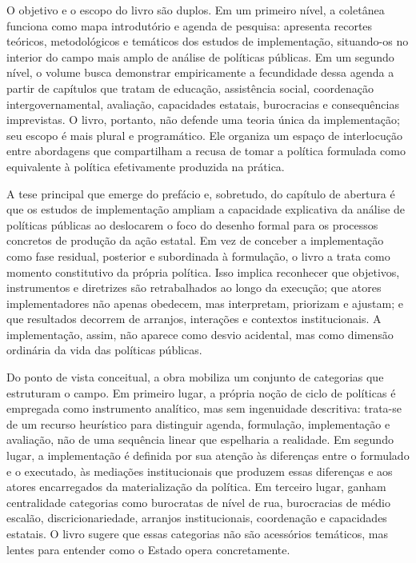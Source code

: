 \documentclass[12pt,a4paper]{article}
\begin{document}
O objetivo e o escopo do livro são duplos. Em um primeiro nível, a coletânea funciona como mapa introdutório e agenda de pesquisa: apresenta recortes teóricos, metodológicos e temáticos dos estudos de implementação, situando-os no interior do campo mais amplo de análise de políticas públicas. Em um segundo nível, o volume busca demonstrar empiricamente a fecundidade dessa agenda a partir de capítulos que tratam de educação, assistência social, coordenação intergovernamental, avaliação, capacidades estatais, burocracias e consequências imprevistas. O livro, portanto, não defende uma teoria única da implementação; seu escopo é mais plural e programático. Ele organiza um espaço de interlocução entre abordagens que compartilham a recusa de tomar a política formulada como equivalente à política efetivamente produzida na prática. \parencite{lotta2019_teorias_analises}

A tese principal que emerge do prefácio e, sobretudo, do capítulo de abertura é que os estudos de implementação ampliam a capacidade explicativa da análise de políticas públicas ao deslocarem o foco do desenho formal para os processos concretos de produção da ação estatal. Em vez de conceber a implementação como fase residual, posterior e subordinada à formulação, o livro a trata como momento constitutivo da própria política. Isso implica reconhecer que objetivos, instrumentos e diretrizes são retrabalhados ao longo da execução; que atores implementadores não apenas obedecem, mas interpretam, priorizam e ajustam; e que resultados decorrem de arranjos, interações e contextos institucionais. A implementação, assim, não aparece como desvio acidental, mas como dimensão ordinária da vida das políticas públicas. \parencite{lotta2019_teorias_analises}

Do ponto de vista conceitual, a obra mobiliza um conjunto de categorias que estruturam o campo. Em primeiro lugar, a própria noção de ciclo de políticas é empregada como instrumento analítico, mas sem ingenuidade descritiva: trata-se de um recurso heurístico para distinguir agenda, formulação, implementação e avaliação, não de uma sequência linear que espelharia a realidade. Em segundo lugar, a implementação é definida por sua atenção às diferenças entre o formulado e o executado, às mediações institucionais que produzem essas diferenças e aos atores encarregados da materialização da política. Em terceiro lugar, ganham centralidade categorias como burocratas de nível de rua, burocracias de médio escalão, discricionariedade, arranjos institucionais, coordenação e capacidades estatais. O livro sugere que essas categorias não são acessórios temáticos, mas lentes para entender como o Estado opera concretamente. \parencite{lotta2019_teorias_analises}
\end{document}
